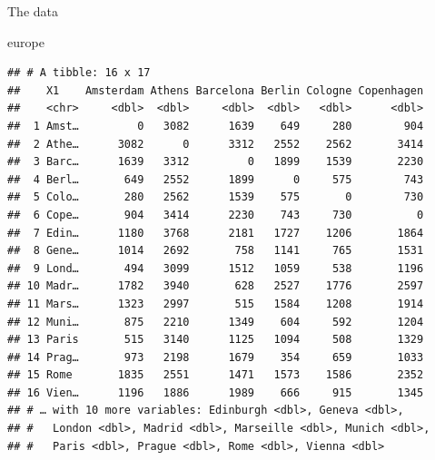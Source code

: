 \documentclass[ignorenonframetext,]{beamer}
\newenvironment{Shaded}{\begin{snugshade}}{\end{snugshade}}
\newcommand{\NormalTok}[1]{#1}
\begin{document}
\begin{frame}[fragile]{The data}
\protect\hypertarget{the-data-12}{}

\begin{Shaded}
\begin{Highlighting}[]
\NormalTok{europe}
\end{Highlighting}
\end{Shaded}

\begin{verbatim}
## # A tibble: 16 x 17
##    X1    Amsterdam Athens Barcelona Berlin Cologne Copenhagen
##    <chr>     <dbl>  <dbl>     <dbl>  <dbl>   <dbl>      <dbl>
##  1 Amst…         0   3082      1639    649     280        904
##  2 Athe…      3082      0      3312   2552    2562       3414
##  3 Barc…      1639   3312         0   1899    1539       2230
##  4 Berl…       649   2552      1899      0     575        743
##  5 Colo…       280   2562      1539    575       0        730
##  6 Cope…       904   3414      2230    743     730          0
##  7 Edin…      1180   3768      2181   1727    1206       1864
##  8 Gene…      1014   2692       758   1141     765       1531
##  9 Lond…       494   3099      1512   1059     538       1196
## 10 Madr…      1782   3940       628   2527    1776       2597
## 11 Mars…      1323   2997       515   1584    1208       1914
## 12 Muni…       875   2210      1349    604     592       1204
## 13 Paris       515   3140      1125   1094     508       1329
## 14 Prag…       973   2198      1679    354     659       1033
## 15 Rome       1835   2551      1471   1573    1586       2352
## 16 Vien…      1196   1886      1989    666     915       1345
## # … with 10 more variables: Edinburgh <dbl>, Geneva <dbl>,
## #   London <dbl>, Madrid <dbl>, Marseille <dbl>, Munich <dbl>,
## #   Paris <dbl>, Prague <dbl>, Rome <dbl>, Vienna <dbl>
\end{verbatim}

\end{frame}
\end{document}
